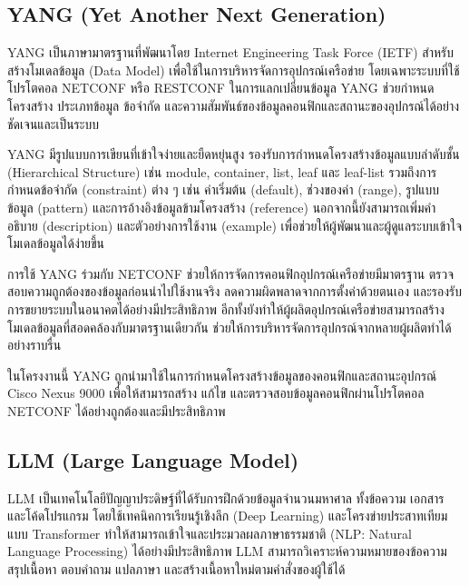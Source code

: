 \subsection{YANG (Yet Another Next Generation)}

\hspace*{1.3em} %
YANG เป็นภาษามาตรฐานที่พัฒนาโดย Internet Engineering Task Force (IETF) สำหรับสร้างโมเดลข้อมูล (Data Model) เพื่อใช้ในการบริหารจัดการอุปกรณ์เครือข่าย โดยเฉพาะระบบที่ใช้โปรโตคอล NETCONF หรือ RESTCONF ในการแลกเปลี่ยนข้อมูล YANG ช่วยกำหนดโครงสร้าง ประเภทข้อมูล ข้อจำกัด และความสัมพันธ์ของข้อมูลคอนฟิกและสถานะของอุปกรณ์ได้อย่างชัดเจนและเป็นระบบ

\hspace*{1.3em} %
YANG มีรูปแบบการเขียนที่เข้าใจง่ายและยืดหยุ่นสูง รองรับการกำหนดโครงสร้างข้อมูลแบบลำดับชั้น (Hierarchical Structure) เช่น module, container, list, leaf และ leaf-list รวมถึงการกำหนดข้อจำกัด (constraint) ต่าง ๆ เช่น ค่าเริ่มต้น (default), ช่วงของค่า (range), รูปแบบข้อมูล (pattern) และการอ้างอิงข้อมูลข้ามโครงสร้าง (reference) นอกจากนี้ยังสามารถเพิ่มคำอธิบาย (description) และตัวอย่างการใช้งาน (example) เพื่อช่วยให้ผู้พัฒนาและผู้ดูแลระบบเข้าใจโมเดลข้อมูลได้ง่ายขึ้น

\hspace*{1.3em} %

\hspace*{1.3em} %
การใช้ YANG ร่วมกับ NETCONF ช่วยให้การจัดการคอนฟิกอุปกรณ์เครือข่ายมีมาตรฐาน ตรวจสอบความถูกต้องของข้อมูลก่อนนำไปใช้งานจริง ลดความผิดพลาดจากการตั้งค่าด้วยตนเอง และรองรับการขยายระบบในอนาคตได้อย่างมีประสิทธิภาพ อีกทั้งยังทำให้ผู้ผลิตอุปกรณ์เครือข่ายสามารถสร้างโมเดลข้อมูลที่สอดคล้องกับมาตรฐานเดียวกัน ช่วยให้การบริหารจัดการอุปกรณ์จากหลายผู้ผลิตทำได้อย่างราบรื่น

\hspace*{1.3em} %
ในโครงงานนี้ YANG ถูกนำมาใช้ในการกำหนดโครงสร้างข้อมูลของคอนฟิกและสถานะอุปกรณ์ Cisco Nexus 9000 เพื่อให้สามารถสร้าง แก้ไข และตรวจสอบข้อมูลคอนฟิกผ่านโปรโตคอล NETCONF ได้อย่างถูกต้องและมีประสิทธิภาพ \parencite{yang}

\subsection{LLM (Large Language Model)}

\hspace*{1.3em} %
LLM เป็นเทคโนโลยีปัญญาประดิษฐ์ที่ได้รับการฝึกด้วยข้อมูลจำนวนมหาศาล ทั้งข้อความ เอกสาร และโค้ดโปรแกรม โดยใช้เทคนิคการเรียนรู้เชิงลึก (Deep Learning) และโครงข่ายประสาทเทียมแบบ Transformer ทำให้สามารถเข้าใจและประมวลผลภาษาธรรมชาติ (NLP: Natural Language Processing) ได้อย่างมีประสิทธิภาพ LLM สามารถวิเคราะห์ความหมายของข้อความ สรุปเนื้อหา ตอบคำถาม แปลภาษา และสร้างเนื้อหาใหม่ตามคำสั่งของผู้ใช้ได้

